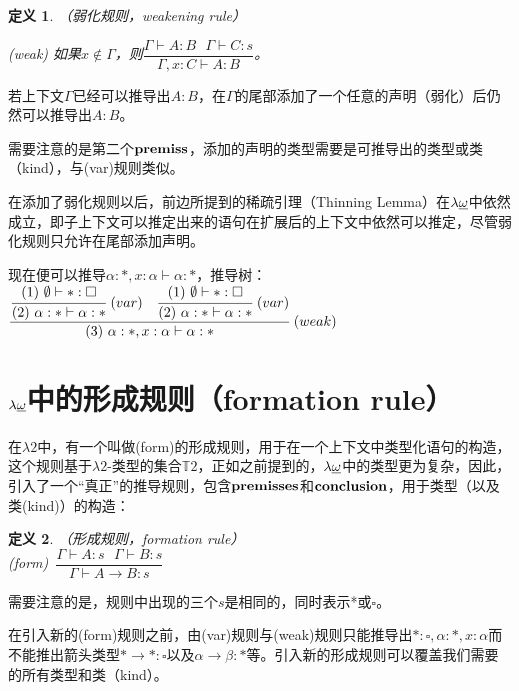 \documentclass[UTF8]{article}
\newtheorem{thm}{定义}[section]
\begin{document}
		\begin{thm}（弱化规则，weakening rule）
			
			(weak) 如果$x\not\in\Gamma$，则$\dfrac{\Gamma\vdash A:B\ \ \ \Gamma\vdash C:s}{\Gamma,x:C\vdash A:B}$。
		\end{thm}
		
		若上下文$\Gamma$已经可以推导出$A:B$，在$\Gamma$的尾部添加了一个任意的声明（弱化）后仍然可以推导出$A:B$。
		
		需要注意的是第二个$\bf premiss$，添加的声明的类型需要是可推导出的类型或类（kind），与(var)规则类似。
		
		在添加了弱化规则以后，前边所提到的稀疏引理（Thinning Lemma）在$\lambda{\uline{\omega}}$中依然成立，即子上下文可以推定出来的语句在扩展后的上下文中依然可以推定，尽管弱化规则只允许在尾部添加声明。
		
		现在便可以推导$\alpha:*,x:\alpha\vdash\alpha:*$，推导树：\\
		
		$\cfrac{\cfrac{(1)\ \emptyset\vdash*:\square}{(2)\ \alpha:*\vdash\alpha:*}\ (var)\ \ \ \cfrac{(1)\ \emptyset\vdash*:\square}{(2)\ \alpha:*\vdash\alpha:*}\ (var)}{(3)\ \alpha:*,x:\alpha\vdash\alpha:*}\ (weak)$
		
	\section{$\lambda{\uline{\omega}}$中的形成规则（formation rule）}
		\noindent
		在$\lambda{2}$中，有一个叫做(form)的形成规则，用于在一个上下文中类型化语句的构造，这个规则基于$\lambda{2}$-类型的集合$\mathbb{T}2$，正如之前提到的，$\lambda{\uline{\omega}}$中的类型更为复杂，因此，引入了一个“真正”的推导规则，包含$\bf premisses$和$\bf conclusion$，用于类型（以及类(kind)）的构造：
		
		\begin{thm}（形成规则，formation rule）\\
			
			(form)\ $\dfrac{\Gamma\vdash A:s\ \ \ \Gamma\vdash B:s}{\Gamma\vdash A\rightarrow B:s}$
		\end{thm}
		
		需要注意的是，规则中出现的三个$s$是相同的，同时表示*或$\square$。
		
		在引入新的(form)规则之前，由(var)规则与(weak)规则只能推导出$*:\square,\alpha:*,x:\alpha$而不能推出箭头类型$*\rightarrow*:\square$以及$\alpha\rightarrow\beta:*$等。引入新的形成规则可以覆盖我们需要的所有类型和类（kind）。\\
		
\end{document}

